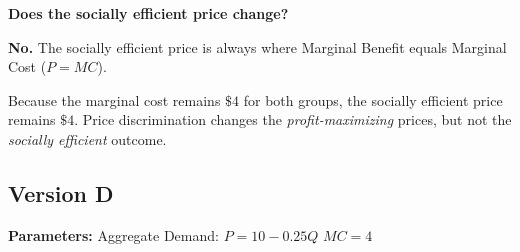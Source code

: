 \documentclass[12pt]{article}
\begin{document}
\begin{subqs}
\item \textbf{Does the socially efficient price change?}
  \begin{solbullets}
    \item \textbf{No.} The socially efficient price is always where Marginal Benefit equals Marginal Cost ($P = MC$).
    \item Because the marginal cost remains $\$4$ for both groups, the socially efficient price remains $\$4$. Price discrimination changes the \textit{profit-maximizing} prices, but not the \textit{socially efficient} outcome.
  \end{solbullets}

\end{subqs}

\newpage

\subsection*{Version D}

\textbf{Parameters:} Aggregate Demand: $P = 10 - 0.25Q$ \textbar{} $MC = 4$
\end{document}
